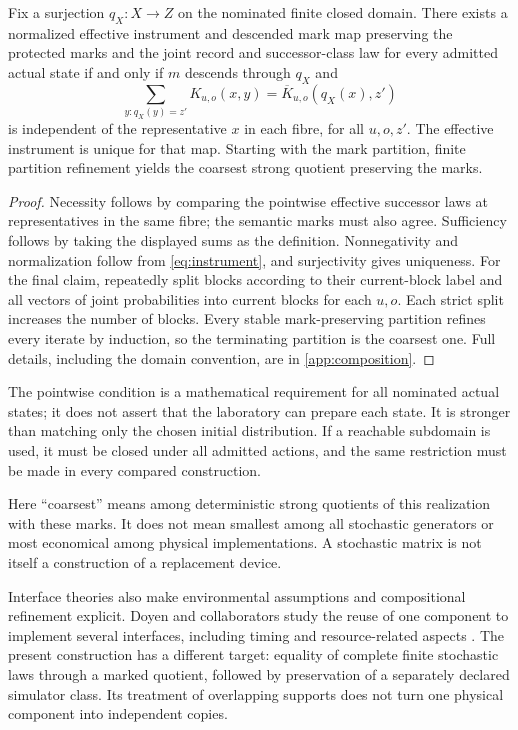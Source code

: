 \begin{theorem}\label{p2-16}
Fix a surjection \(q_X:X\to Z\) on the nominated finite closed domain. There exists a normalized effective instrument and descended mark map preserving the protected marks and the joint record and successor-class law for every admitted actual state if and only if \(m\) descends through \(q_X\) and
\begin{equation}\label{eq:strong-quotient}
 \sum_{y:q_X(y)=z'}K_{u,o}(x,y)
 =\overline K_{u,o}(q_X(x),z')
\end{equation}
is independent of the representative \(x\) in each fibre, for all \(u,o,z'\). The effective instrument is unique for that map. Starting with the mark partition, finite partition refinement yields the coarsest strong quotient preserving the marks.
\end{theorem}
\begin{proof}
Necessity follows by comparing the pointwise effective successor laws at representatives in the same fibre; the semantic marks must also agree. Sufficiency follows by taking the displayed sums as the definition. Nonnegativity and normalization follow from \cref{eq:instrument}, and surjectivity gives uniqueness. For the final claim, repeatedly split blocks according to their current-block label and all vectors of joint probabilities into current blocks for each \(u,o\). Each strict split increases the number of blocks. Every stable mark-preserving partition refines every iterate by induction, so the terminating partition is the coarsest one. Full details, including the domain convention, are in \cref{app:composition}.
\end{proof}
The pointwise condition is a mathematical requirement for all nominated actual states; it does not assert that the laboratory can prepare each state. It is stronger than matching only the chosen initial distribution. If a reachable subdomain is used, it must be closed under all admitted actions, and the same restriction must be made in every compared construction.

Here ``coarsest'' means among deterministic strong quotients of this realization with these marks. It does not mean smallest among all stochastic generators or most economical among physical implementations. A stochastic matrix is not itself a construction of a replacement device.

Interface theories also make environmental assumptions and compositional refinement explicit. Doyen and collaborators study the reuse of one component to implement several interfaces, including timing and resource-related aspects \cite{DoyenEtAl2008}. The present construction has a different target: equality of complete finite stochastic laws through a marked quotient, followed by preservation of a separately declared simulator class. Its treatment of overlapping supports does not turn one physical component into independent copies.

